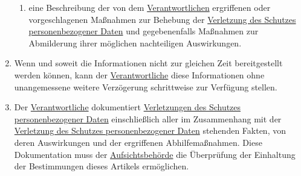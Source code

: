 \begin{enumerate}
\begin{enumerate}
    \item eine Beschreibung der von dem \hyperref[itm:04-7]{Verantwortlichen} ergriffenen oder vorgeschlagenen Maßnahmen zur Behebung der
     \hyperref[itm:04-12]{Verletzung des Schutzes personenbezogener Daten} und gegebenenfalls Maßnahmen zur Abmilderung ihrer möglichen
     nachteiligen Auswirkungen.
    \label{itm:33-3d}

  \end{enumerate}

  \item Wenn und soweit die Informationen nicht zur gleichen Zeit bereitgestellt werden können, kann der \hyperref[itm:04-7]{Verantwortliche}
   diese Informationen ohne unangemessene weitere Verzögerung schrittweise zur Verfügung stellen.
  \label{itm:33-4}

  \item Der \hyperref[itm:04-7]{Verantwortliche} dokumentiert \hyperref[itm:04-12]{Verletzungen des Schutzes personenbezogener Daten} einschließlich aller im
   Zusammenhang mit der \hyperref[itm:04-12]{Verletzung des Schutzes personenbezogener Daten} stehenden Fakten, von deren Auswirkungen und
   der ergriffenen Abhilfemaßnahmen. Diese Dokumentation muss der \hyperref[itm:04-21]{Aufsichtsbehörde} die Überprüfung der Einhaltung der
   Bestimmungen dieses Artikels ermöglichen.
  \label{itm:33-5}

\end{enumerate}


